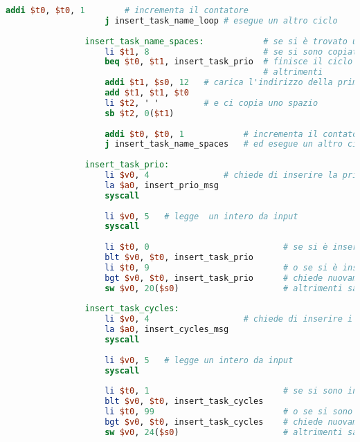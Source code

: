 \begin{center}
\begin{lstlisting}[language=mips, gobble=14, stepnumber=1]
                    addi $t0, $t0, 1		# incrementa il contatore
                    j insert_task_name_loop	# esegue un altro ciclo
                    
                insert_task_name_spaces:			# se si è trovato un carattere speciale
                    li $t1, 8						# se si sono copiati 8 caratteri
                    beq $t0, $t1, insert_task_prio	# finisce il ciclo
                									# altrimenti
                    addi $t1, $s0, 12	# carica l'indirizzo della prima posizione del nome disponibile
                    add $t1, $t1, $t0
                    li $t2, ' '			# e ci copia uno spazio
                    sb $t2, 0($t1)
                	
                    addi $t0, $t0, 1			# incrementa il contatore
                    j insert_task_name_spaces	# ed esegue un altro ciclo
                    
                insert_task_prio:
                    li $v0, 4				# chiede di inserire la priorità del task
                    la $a0, insert_prio_msg
                    syscall
                    
                    li $v0, 5	# legge  un intero da input
                    syscall
                    
                    li $t0, 0                           # se si è inserita una priorità minore di 0
                    blt $v0, $t0, insert_task_prio
                    li $t0, 9                           # o se si è inserita una priorità maggiore di 9
                    bgt $v0, $t0, insert_task_prio      # chiede nuovamente la priorità del task
                    sw $v0, 20($s0)                     # altrimenti salva nell'heap
                    
                insert_task_cycles:
                    li $v0, 4					# chiede di inserire i cicli di esecuzione totali del task
                    la $a0, insert_cycles_msg
                    syscall
                    
                    li $v0, 5	# legge un intero da input
                    syscall
                    
                    li $t0, 1                           # se si sono inseriti meno di 1 ciclo
                    blt $v0, $t0, insert_task_cycles
                    li $t0, 99                          # o se si sono inseriti più di 99 cicli
                    bgt $v0, $t0, insert_task_cycles    # chiede nuovamente i cicli del task
                    sw $v0, 24($s0)                     # altrimenti salva nell'heap
                    

\end{lstlisting}
\end{center}
